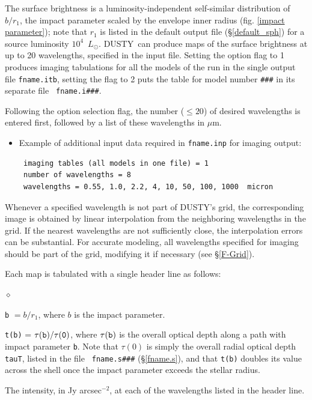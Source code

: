 \documentclass[11pt]{article}
\def\D  {{\sf DUSTY}}
\def\E#1{\hbox{$10^{#1}$}}
\def\mic    {\hbox{$\mu$m}}
\def\Lo     {\hbox{$L_{\odot}$}}
\begin{document}
The surface brightness is a luminosity-independent self-similar distribution
\cite{IE96a} of $b/r_1$, the impact parameter scaled by the envelope inner
radius (fig. \ref{impact parameter}); note that $r_1$ is listed in the default
output file (\S\ref{default_sph}) for a source luminosity \E4~\Lo. \D\ can produce
maps of the surface brightness at up to 20 wavelengths, specified in the input
file. Setting the option flag to 1 produces imaging tabulations for all the
models of the run in the single output file {\tt fname.itb}, setting the flag
to 2 puts the table for model number {\tt \#\#\#} in its separate file {\tt
fname.i\#\#\#}.

Following the option selection flag, the number ($\le 20$) of desired
wavelengths is entered first, followed by a list of these wavelengths in \mic.

\begin{itemize}
\item Example of additional input data required in {\tt fname.inp} for imaging
output:
\begin{verbatim}
 imaging tables (all models in one file) = 1
 number of wavelengths = 8
 wavelengths = 0.55, 1.0, 2.2, 4, 10, 50, 100, 1000  micron
\end{verbatim}
\end{itemize}
Whenever a specified wavelength is not part of \D's grid, the corresponding
image is obtained by linear interpolation from the neighboring wavelengths in
the grid.  If the nearest wavelengths are not sufficiently close, the
interpolation errors can be substantial. For accurate modeling, all wavelengths
specified for imaging should be part of the grid, modifying it if necessary
(see \S\ref{F-Grid}).

Each map is tabulated with a single header line as follows:
\begin{list}{$\diamond$}{}
\item{\tt b} $= b/r_1$, where $b$ is the impact parameter.
\item
{\tt t(b)} = $\tau(\tt b)/\tau(0)$, where $\tau(\tt b)$ is the overall optical
depth along a path with impact parameter {\tt b}.  Note that $\tau(0)$ is
simply the overall radial optical depth {\tt tauT}, listed in the file {\tt
fname.s\#\#\#} (\S \ref{fname.s}), and that {\tt t(b)} doubles its value across
the shell once the impact parameter exceeds the stellar radius.
\item
The intensity, in Jy arcsec$^{-2}$, at each of the wavelengths listed in the
header line.
\end{list}
\end{document}
